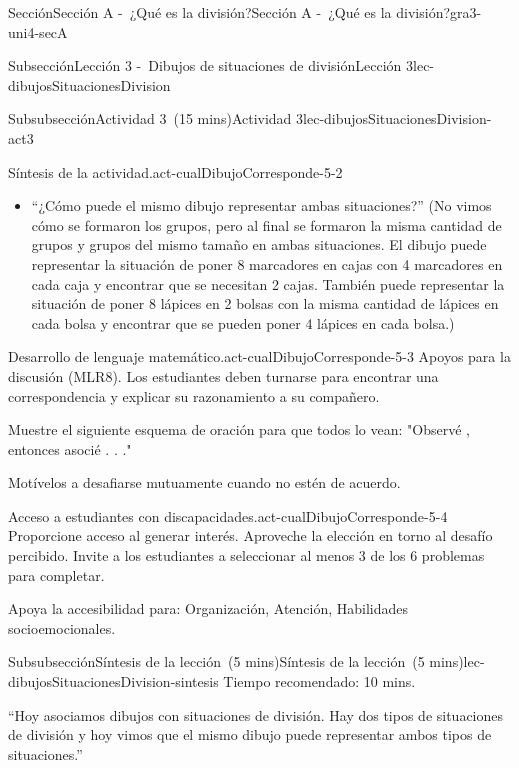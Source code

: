 \documentclass[oneside,10pt,]{article}
\begin{document}
\begin{sectionptx}{Sección}{Sección A -~¿Qué es la división?}{}{Sección A -~¿Qué es la división?}{}{}{gra3-uni4-secA}
\begin{subsectionptx}{Subsección}{Lección 3 -~Dibujos de situaciones de división}{}{Lección 3}{}{}{lec-dibujosSituacionesDivision}
\begin{subsubsectionptx}{Subsubsección}{Actividad 3~(15 mins)}{}{Actividad 3}{}{}{lec-dibujosSituacionesDivision-act3}
\begin{paragraphs}{Síntesis de la actividad.}{act-cualDibujoCorresponde-5-2}
\begin{itemize}[label=\textbullet]
\begin{itemize}[label=$\circ$]
\item{}Lin tiene 8 lápices de colores y 2 bolsas. Cada bolsa tiene la misma cantidad de lápices de colores. ¿Cuántos lápices de colores habrá en cada bolsa?%
\end{itemize}
\item{}``¿Cómo puede el mismo dibujo representar ambas situaciones?'' (No vimos cómo se formaron los grupos, pero al final se formaron la misma cantidad de grupos y grupos del mismo tamaño en ambas situaciones. El dibujo puede representar la situación de poner 8 marcadores en cajas con 4 marcadores en cada caja y encontrar que se necesitan 2 cajas. También puede representar la situación de poner 8 lápices en 2 bolsas con la misma cantidad de lápices en cada bolsa y encontrar que se pueden poner 4 lápices en cada bolsa.)%
\end{itemize}
\end{paragraphs}%
\begin{paragraphs}{Desarrollo de lenguaje matemático.}{act-cualDibujoCorresponde-5-3}%
Apoyos para la discusión (MLR8). Los estudiantes deben turnarse para encontrar una correspondencia y explicar su razonamiento a su compañero.%
\par
Muestre el siguiente esquema de oración para que todos lo vean: "Observé \textunderscore{}\textunderscore{}\textunderscore{}, entonces asocié . . ."%
\par
Motívelos a desafiarse mutuamente cuando no estén de acuerdo.%
\end{paragraphs}%
\begin{paragraphs}{Acceso a estudiantes con discapacidades.}{act-cualDibujoCorresponde-5-4}%
Proporcione acceso al generar interés. Aproveche la elección en torno al desafío percibido. Invite a los estudiantes a seleccionar al menos 3 de los 6 problemas para completar.%
\par
Apoya la accesibilidad para: Organización, Atención, Habilidades socioemocionales.%
\end{paragraphs}%
\end{subsubsectionptx}
%
%
\typeout{************************************************}
\typeout{************************************************}
%
\begin{subsubsectionptx}{Subsubsección}{Síntesis de la lección~(5 mins)}{}{Síntesis de la lección~(5 mins)}{}{}{lec-dibujosSituacionesDivision-sintesis}
Tiempo recomendado: 10 mins.%
\par
``Hoy asociamos dibujos con situaciones de división. Hay dos tipos de situaciones de división y hoy vimos que el mismo dibujo puede representar ambos tipos de situaciones.''%

\end{subsubsectionptx}
\end{subsectionptx}
\end{sectionptx}
\end{document}
